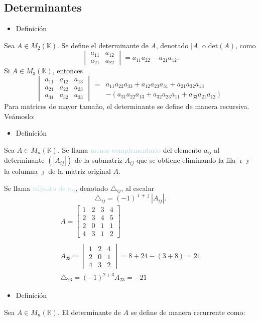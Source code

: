 \subsection{Determinantes}
\begin{itemize}[label=\color{red}\textbullet, leftmargin=*]
	\item \color{lightblue}Definición
\end{itemize}
Sea $A\in M_2(\mathbb{K})$. Se define el determinante de $A$, denotado $|A|$ o $\mathrm{det}(A)$, como \[ \begin{vmatrix}
	a_{11} & a_{12}\\
	a_{21} & a_{22}
\end{vmatrix}=a_{11}a_{22}-a_{21}a_{12}. \]
Si $A\in M_3(\mathbb{K})$, entonces \[ \begin{vmatrix}
	a_{11} & a_{12} & a_{13}\\
	a_{21}  & a_{22} & a_{23}\\
	a_{31} & a_{32} & a_{33}
\end{vmatrix}\begin{aligned}
\\
=&a_{11}a_{22}a_{33}+a_{12}a_{23}a_{31}+a_{21}a_{32}a_{13}\\
&-(a_{31}a_{22}a_{13}+a_{32}a_{23}a_{11}+a_{33}a_{21}a_{12})
\end{aligned} \]
Para matrices de mayor tamaño, el determinante se define de manera recursiva. Veámoslo:
\begin{itemize}[label=\color{red}\textbullet, leftmargin=*]
	\item \color{lightblue}Definición
\end{itemize}
Sea $A\in M_n(\mathbb{K})$. Se llama \textcolor{lightblue}{menor complementario} del elemento $a_{ij}$ al determinante $(|A_{ij}|)$ de la submatriz $A_{ij}$ que se obtiene eliminando la fila $\imath$ y la columna $\jmath$ de la matriz original $A$.

Se llama \textcolor{lightblue}{adjunto de $a_{ij}$}, denotado $\triangle_{ij}$, al escalar \[ \triangle_{ij}=(-1)^{\imath+\jmath}|A_{ij}|. \]
\Ej
\[ \begin{array}{l}
	A=\begin{bmatrix}
	1 & 2 & 3 & 4 \\
	2 & 3 & 4 & 5 \\
	2 & 0 & 1 & 1 \\
	4 & 3 & 1 & 2
\end{bmatrix}\\\\

A_{23}=\begin{vmatrix}
	1 & 2 & 4 \\
	2 & 0 & 1 \\
	4 & 3 & 2
\end{vmatrix}=8+24-(3+8)=21\\
\triangle_{23}=(-1)^{2+3}A_{23}=-21
\end{array} \]
\begin{itemize}[label=\color{red}\textbullet, leftmargin=*]
	\item \color{lightblue}Definición
\end{itemize}
Sea $A\in M_n(\mathbb{K})$. El determinante de $A$ se define de manera recurrente como:

